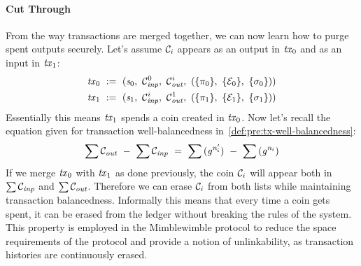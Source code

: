 \paragraph{Cut Through} \label{par:pre:mimblewimble:cut}
From the way transactions are merged together, we can now learn how to purge spent outputs securely.
Let's assume $\mathcal{C}_i$ appears as an output in $\mathit{tx}_0$ and as an input in $\mathit{tx}_1$:
\begin{gather*}
    \mathit{tx}_0 ~:=~ (\mathit{s}_0 ,~ \mathcal{C}_{\mathit{inp}}^0 ,~ \mathcal{C}_{\mathit{out}}^i ,~ (\{\pi_0\} ,~ \{\mathcal{E}_0\} ,~ \{\sigma_0\}) )\\
    \mathit{tx}_1 ~:=~ (\mathit{s}_1 ,~ \mathcal{C}_{\mathit{inp}}^i ,~ \mathcal{C}_{\mathit{out}}^1 ,~ (\{\pi_1\} ,~ \{\mathcal{E}_1\} ,~ \{\sigma_1\}) )\\
\end{gather*}
Essentially this means $\mathit{tx}_1$ spends a coin created in $\mathit{tx}_0$.
Now let's recall the equation given for transaction well-balancedness in~\cref{def:pre:tx-well-balancedness}:
\[ \sum{\mathcal{C}_{\mathit{out}}} ~-~ \sum{\mathcal{C}_{\mathit{inp}}} ~=~ \sum{(\mathit{g}^{\mathit{n}'_i})} ~-~ \sum{(\mathit{g}^{\mathit{n}_i})} \]
If we merge $\mathit{tx}_0$ with $\mathit{tx}_1$ as done previously, the coin $\mathcal{C}_i$ will appear both in $\sum{\mathcal{C}_{\mathit{inp}}}$ and $\sum{\mathcal{C}_{\mathit{out}}}$.
Therefore we can erase $\mathcal{C}_i$ from both lists while maintaining transaction balancedness.
Informally this means that every time a coin gets spent, it can be erased from the ledger without breaking the rules of the system.
This property is employed in the Mimblewimble protocol to reduce the space requirements of the protocol and provide a notion of unlinkability, as transaction histories are continuously erased.

